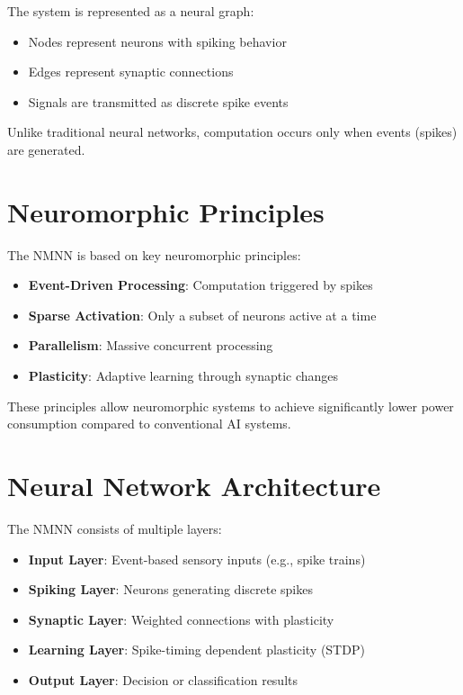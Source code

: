 \documentclass[12pt]{article}
\begin{document}
The system is represented as a neural graph:

\begin{itemize}
\item Nodes represent neurons with spiking behavior
\item Edges represent synaptic connections
\item Signals are transmitted as discrete spike events
\end{itemize}

Unlike traditional neural networks, computation occurs only when events (spikes) are generated.

\section{Neuromorphic Principles}

The NMNN is based on key neuromorphic principles:

\begin{itemize}
\item \textbf{Event-Driven Processing}: Computation triggered by spikes
\item \textbf{Sparse Activation}: Only a subset of neurons active at a time
\item \textbf{Parallelism}: Massive concurrent processing
\item \textbf{Plasticity}: Adaptive learning through synaptic changes
\end{itemize}

These principles allow neuromorphic systems to achieve significantly lower power consumption compared to conventional AI systems.

\section{Neural Network Architecture}

The NMNN consists of multiple layers:

\begin{itemize}
\item \textbf{Input Layer}: Event-based sensory inputs (e.g., spike trains)
\item \textbf{Spiking Layer}: Neurons generating discrete spikes
\item \textbf{Synaptic Layer}: Weighted connections with plasticity
\item \textbf{Learning Layer}: Spike-timing dependent plasticity (STDP)
\item \textbf{Output Layer}: Decision or classification results
\end{itemize}
\end{document}
